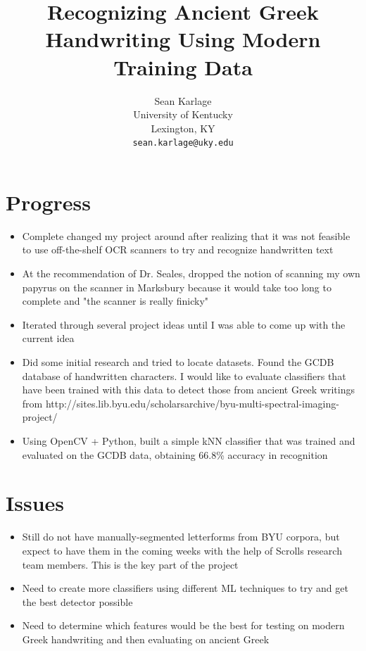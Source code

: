 \documentclass[10pt,twocolumn,letterpaper]{article}
\begin{document}
\title{Recognizing Ancient Greek Handwriting Using Modern Training Data}

\author{Sean Karlage\\
University of Kentucky\\
Lexington, KY\\
{\tt\small sean.karlage@uky.edu}
}

\maketitle

\section{Progress}
\begin{itemize}
    \item Complete changed my project around after realizing that it was not feasible to use off-the-shelf OCR scanners to try and recognize handwritten text
    \item At the recommendation of Dr. Seales, dropped the notion of scanning my own papyrus on the scanner in Marksbury because it would take too long to complete and "the scanner is really finicky"
    \item Iterated through several project ideas until I was able to come up with the current idea
    \item Did some initial research and tried to locate datasets. Found the GCDB database of handwritten characters. I would like to evaluate classifiers that have been trained with this data to detect those from ancient Greek writings from http://sites.lib.byu.edu/scholarsarchive/byu-multi-spectral-imaging-project/
    \item Using OpenCV + Python, built a simple kNN classifier that was trained and evaluated on the GCDB data, obtaining 66.8\% accuracy in recognition
\end{itemize}

\section{Issues}
\begin{itemize}
    \item Still do not have manually-segmented letterforms from BYU corpora, but expect to have them in the coming weeks with the help of Scrolls research team members. This is the key part of the project
    \item Need to create more classifiers using different ML techniques to try and get the best detector possible
    \item Need to determine which features would be the best for testing on modern Greek handwriting and then evaluating on ancient Greek
\end{itemize}
\end{document}
